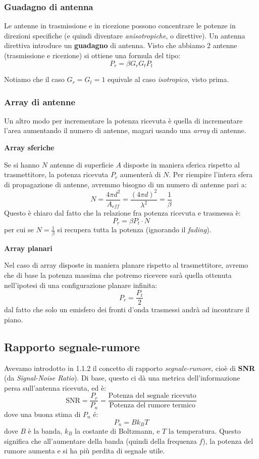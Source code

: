 \documentclass[a4paper,11pt]{article}
\begin{document}
\subsubsection{Guadagno di antenna}
Le antenne in trasmissione e in ricezione possono concentrare le potenze in direzioni specifiche (e quindi diventare \textit{anisotropiche}, o direttive). Un antenna direttiva introduce un \textbf{guadagno} di antenna. Visto che abbiamo 2 antenne (trasmissione e ricezione) si ottiene una formula del tipo:
$$
P_r = \beta G_r G_t P_t
$$

Notiamo che il caso $G_r = G_t = 1$ equivale al caso \textit{isotropico}, visto prima.

\subsubsection{Array di antenne}
Un altro modo per incrementare la potenza ricevuta è quella di incrementare l'area aumentando il numero di antenne, magari usando una \textit{array} di antenne.

\par\smallskip

\noindent
\textbf{\textsf{Array sferiche}}

\noindent
Se si hanno $N$ antenne di superficie $A$ disposte in maniera sferica rispetto al trasmettitore, la potenza ricevuta $P_r$ aumenterà di $N$. Per riempire l'intera sfera di propagazione di antenne, avremmo bisogno di un numero di antenne pari a:
$$
N = \frac{4 \pi d^2}{A_{eff}} = \frac{(4 \pi d)^2}{\lambda^2} = \frac{1}{\beta}
$$
Questo è chiaro dal fatto che la relazione fra potenza ricevuta e trasmessa è:
$$
P_r = \beta P_t \cdot N
$$
per cui se $N = \frac{1}{\beta}$ si recupera tutta la potenza (ignorando il \textit{fading}).

\par\smallskip

\noindent
\textbf{\textsf{Array planari}}

\noindent
Nel caso di array disposte in maniera planare rispetto al trasmettitore, avremo che di base la potenza massima che potremo ricevere sarà quella ottenuta nell'ipotesi di una configurazione planare infinita:
$$
P_r = \frac{P_t}{2}
$$
dal fatto che solo un emisfero dei fronti d'onda trasmessi andrà ad incontrare il piano.

\subsection{Rapporto segnale-rumore}
Avevamo introdotto in 1.1.2 il concetto di rapporto \textit{segnale-rumore}, cioè di \textbf{SNR} (da \textit{Signal-Noise Ratio}). Di base, questo ci dà una metrica dell'informazione persa sull'antenna ricevuta, ed è:
$$
\mathrm{SNR} = \frac{P_r}{P_n} = \frac{\text{Potenza del segnale ricevuto}}{\text{Potenza del rumore termico}}
$$
dove una buona stima di $P_n$ é:
$$
P_n = B k_B T
$$
dove $B$ è la banda, $k_B$ la costante di Boltzmann, e $T$ la temperatura. Questo significa che all'aumentare della banda (quindi della frequenza $f$), la potenza del rumore aumenta e si ha più perdita di segnale utile.
\end{document}
